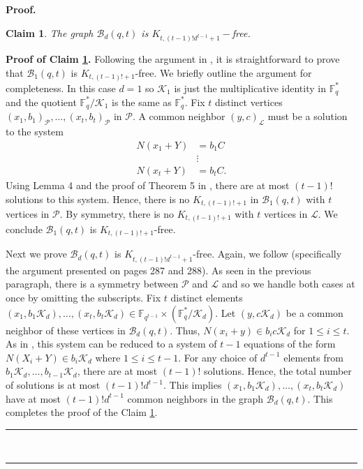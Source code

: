 \documentclass[12pt]{article}%
\newtheorem{claim}[theorem]{Claim}
\newenvironment{proof}[1][Proof]{\noindent\textbf{#1.} }
{\hfill \ \rule{0.5em}{0.5em}}
\begin{document}
\begin{proof}
\begin{claim}\label{quotient claim}
    The graph $\mathcal{B}_d(q,t)$ is $K_{t,(t-1)!d^{t-1}+1}-$free.
\end{claim}
\begin{proof}[Proof of Claim \ref{quotient claim}]
Following the argument in \cite{ars}, it is 
straightforward to prove that $\mathcal B_1(q,t)$ is $K_{t,(t-1)!+1}$-free.  We briefly outline the argument for completeness.  In this case $d = 1$ so 
$\mathcal{K}_1$ is just the multiplicative identity 
in $\mathbb{F}_q^*$ and the quotient $\mathbb{F}_q^* / \mathcal{K}_1$ is the same as $\mathbb{F}_q^*$.  
Fix $t$ distinct vertices $(x_1, b_1)_{ \mathcal{P} } , \dots , (x_t , b_t )_{ \mathcal{P}}$ in $\mathcal{P}$.  
A common neighbor $(y,c)_{ \mathcal{L}}$ must be a solution to the system 
$$\begin{aligned}
        N(x_1+Y)&=b_1C\\
        &\vdots\\
        N(x_t+Y)&=b_tC.
    \end{aligned}$$
    Using Lemma 4 and the proof of Theorem 5 in \cite{ars}, there are at most $(t-1)!$ solutions to this system.  Hence, there is no $K_{t,(t-1)!+1}$ in 
$\mathcal{B}_1 (q,t)$ with $t$ vertices in $\mathcal{P}$.  By symmetry, there is no $K_{t,(t-1)!+1}$ with 
$t$ vertices in $\mathcal{L}$.  We conclude $\mathcal{B}_1 (q,t)$ is $K_{t , (t-1) ! + 1}$-free.  

Next we prove $\mathcal{B}_d (q,t)$ is 
$K_{t , (t-1)! d^{t-1} + 1}$-free.  Again, we follow \cite{ars} (specifically the argument presented on pages 287 and 288).  As seen in the previous paragraph, there is a symmetry between $\mathcal{P}$ and $\mathcal{L}$ and so we handle both cases at once by omitting the subscripts.    
    Fix $t$ distinct elements $(x_1,b_1\mathcal{K}_d ),\ldots,(x_t,b_t \mathcal{K}_d)\in\mathbb F_{q^{t-1}}\times(\mathbb F_q^*/\mathcal{K}_d)$. Let $(y,c \mathcal{K}_d)$ be a common neighbor of these vertices in $\mathcal B_d(q,t)$. 
    Thus, $N(x_i + y ) \in b_i c \mathcal{K}_d$ for $1 \leq i \leq t$.  As in \cite{ars}, this system can be reduced to a system of $t-1$ equations of the form $N(X_i + Y) \in b_i \mathcal{K}_d$ where $1 \leq i \leq t-1$.  For any choice of $d^{t-1}$ elements from $b_1 \mathcal{K}_d , \dots , b_{t-1} \mathcal{K}_d$, there are at most $(t-1)!$ solutions.  Hence, the total number of solutions is at most $(t-1)!d^{t-1}$.  This implies $(x_1,b_1\mathcal{K}_d ),\ldots,(x_t,b_t \mathcal{K}_d)$ have at most $(t-1)!d^{t-1}$ common neighbors in the graph $\mathcal{B}_d(q,t)$.  This completes the proof of the Claim \ref{quotient claim}.
    \end{proof}


\end{proof}
\end{document}
